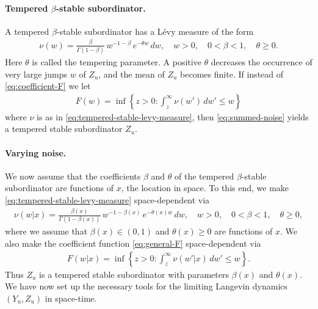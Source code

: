 \documentclass[a4paper,12pt]{article}
\numberwithin{equation}{section}
\theoremstyle{plain}
\theoremstyle{definition}
\theoremstyle{remark}
\numberwithin{equation}{section}
\newcommand{\1}{\mathbf 1}
\begin{document}
\paragraph{Tempered $\beta$-stable subordinator.}
A tempered $\beta$-stable subordinator has a L\'evy measure of the form
\begin{align}
  \label{eq:tempered-stable-levy-measure}
  \nu(w) = \frac{\beta}{\Gamma(1-\beta)}\, w^{-1-\beta}\,e^{-\theta w}\,dw, 
  \quad w > 0, \quad 0 < \beta < 1, \quad \theta \ge 0. 
\end{align}
Here $\theta$ is called the tempering parameter. A positive $\theta$ decreases 
the occurrence of very large jumps $w$ of $Z_u$, and the mean of $Z_u$ becomes 
finite.  If instead of \eqref{eq:coefficient-F} we let 
\begin{align} \label{eq:general-F}
  F(w) = \inf\left\lbrace z > 0: \int_z^\infty \nu(w')\,dw' \le w \right\rbrace
\end{align}
where $\nu$ is as in \eqref{eq:tempered-stable-levy-measure}, then 
\eqref{eq:summed-noise}
yields a tempered stable subordinator $Z_u$.

\paragraph{Varying noise.}
We now assume that the coefficients $\beta$ and $\theta$ of the tempered 
$\beta$-stable subordinator are functions of $x$, the location in space. 
To this end, we make 
\eqref{eq:tempered-stable-levy-measure} space-dependent via
\begin{align}
  \label{eq:varying-tempered-stable-levy-measure}
  \nu(w | x) = \frac{\beta(x)}{\Gamma(1-\beta(x))}\, 
  w^{-1-\beta(x)}\,e^{-\theta(x) w}\,dw, 
  \quad w > 0, \quad 0 < \beta < 1, \quad \theta \ge 0, 
\end{align}
where we assume that $\beta(x) \in (0,1)$ and $\theta(x) \ge 0$ are  
functions of $x$.
We also make the coefficient function \eqref{eq:general-F} space-dependent via
\begin{align} \label{eq:varying-general-F}
  F(w|x) = \inf\left\lbrace z > 0: \int_z^\infty \nu(w'|x)\,dw' \le w 
  \right\rbrace.
\end{align}
Thus $Z_u$ is a tempered stable subordinator with parameters $\beta(x)$ and 
$\theta(x)$. 
We have now set up the necessary tools for the limiting Langevin 
dynamics $(Y_u, Z_u)$ in space-time.
\end{document}
